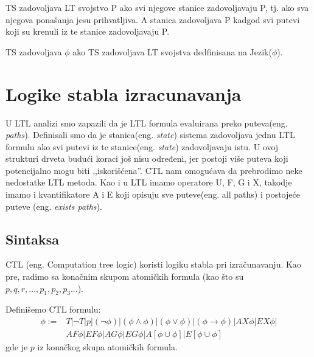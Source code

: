 \documentclass[a4paper]{article}
\begin{document}
{	TS zadovoljava LT svojstvo P ako svi njegove stanice zadovoljavaju P, tj. ako sva njegova ponašanja jesu prihvatljiva. A stanica zadovoljava P kadgod svi putevi koji su krenuli iz te stanice zadovoljavaju P.

	TS zadovoljava $\phi$ ako TS zadovoljava LT svojstva dedfinisana na Jezik($\phi$).


	\section{Logike stabla izracunavanja}
	\label{sec:CTL}
	U LTL analizi smo zapazili da je LTL formula evaluirana preko puteva(eng. \emph{paths}). Definisali smo da je stanica(eng. \emph{state}) sistema
	zadovoljava jednu LTL formulu ako svi putevi iz te stanice(eng. \emph{state}) zadovoljavaju istu. U ovoj strukturi drveta budući koraci još nisu
	određeni, jer postoji više puteva koji potencijalno mogu biti ,,iskorišćena''.
	CTL nam omogućava da prebrodimo neke nedostatke LTL metoda. Kao i u LTL imamo operatore U, F, G i X, takodje imamo i kvantifikatore
	A i E koji opisuju sve puteve(eng. all paths) i postojeće puteve (eng. \emph{exists paths}). 

\subsection{Sintaksa}
	\label{subsec:podnaslovN}
CTL (eng. Computation tree logic) koristi logiku stabla pri izračunavanju. 
	Kao pre, radimo sa konačnim skupom atomičkih formula (kao što su $p, q, r,...,p_1,p_2,p_3...$).

	Definišemo CTL formulu:
\begin{equation}
\begin{split}
\phi := &T | \neg T | p | (\neg \phi) | (\phi \wedge \phi) | (\phi \vee \phi) | (\phi \rightarrow \phi)| AX\phi | EX\phi | \\
          &  AF\phi | EF\phi | AG\phi | EG\phi | A[\phi \cup \phi] | E[\phi \cup \phi]
\end{split}
\end{equation}
	gde je $p$ iz konačkog skupa atomičkih formula.
	\newline
	
}
\end{document}
